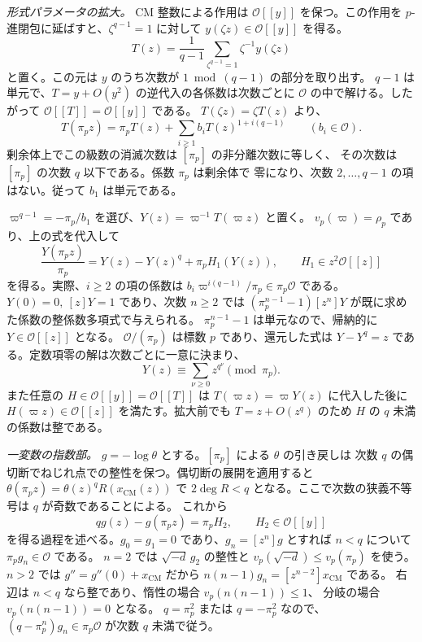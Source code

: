 \emph{形式パラメータの拡大。}
CM 整数による作用は \(\mathcal O[[y]]\) を保つ。この作用を
\(p\)-進閉包に延ばすと、\(\zeta^{q-1}=1\) に対して
\(y(\zeta z)\in\mathcal O[[y]]\) を得る。
\[
 T(z)=\frac{1}{q-1}\sum_{\zeta^{q-1}=1}\zeta^{-1}y(\zeta z)
\]
と置く。この元は \(y\) のうち次数が \(1\bmod(q-1)\) の部分を取り出す。
\(q-1\) は単元で、\(T=y+O(y^2)\) の逆代入の各係数は次数ごとに
\(\mathcal O\) の中で解ける。したがって
\(\mathcal O[[T]]=\mathcal O[[y]]\) である。
\(T(\zeta z)=\zeta T(z)\) より、
\[
 T(\pi_p z)=\pi_p T(z)+\sum_{i\ge1}b_i T(z)^{1+i(q-1)}
 \qquad (b_i\in\mathcal O).
\]
剰余体上でこの級数の消滅次数は \([\pi_p]\) の非分離次数に等しく、
その次数は \([\pi_p]\) の次数 \(q\) 以下である。係数 \(\pi_p\) は剰余体で
零になり、次数 \(2,\ldots,q-1\) の項はない。従って \(b_1\) は単元である。

\(\varpi^{q-1}=-\pi_p/b_1\) を選び、\(Y(z)=\varpi^{-1}T(\varpi z)\) と置く。
\(v_p(\varpi)=\rho_p\) であり、上の式を代入して
\[
 \frac{Y(\pi_p z)}{\pi_p}=Y(z)-Y(z)^q+\pi_p H_1(Y(z)),
 \qquad H_1\in z^2\mathcal O[[z]]
\]
を得る。実際、\(i\ge2\) の項の係数は
\(b_i\varpi^{i(q-1)}/\pi_p\in\pi_p\mathcal O\) である。
\(Y(0)=0,\ [z]Y=1\) であり、次数 \(n\ge2\) では
\((\pi_p^{n-1}-1)[z^n]Y\) が既に求めた係数の整係数多項式で与えられる。
\(\pi_p^{n-1}-1\) は単元なので、帰納的に \(Y\in\mathcal O[[z]]\) となる。
\(\mathcal O/(\pi_p)\) は標数 \(p\) であり、還元した式は \(Y-Y^q=z\)
である。定数項零の解は次数ごとに一意に決まり、
\begin{equation}\label{eq:upper-formalparam}
 Y(z)\equiv\sum_{\nu\ge0}z^{q^\nu}\pmod{\pi_p}.
\end{equation}
また任意の \(H\in\mathcal O[[y]]=\mathcal O[[T]]\) は
\(T(\varpi z)=\varpi Y(z)\) に代入した後に \(H(\varpi z)\in\mathcal O[[z]]\)
を満たす。拡大前でも \(T=z+O(z^q)\) のため \(H\) の \(q\) 未満の係数は整である。

\emph{一変数の指数部。}
\(g=-\log\theta\) とする。\([\pi_p]\) による \(\theta\) の引き戻しは
次数 \(q\) の偶切断でねじれ点での整性を保つ。偶切断の展開を適用すると
\(\theta(\pi_p z)=\theta(z)^qR(x_\mathrm{CM}(z))\) で
\(2\deg R<q\) となる。ここで次数の狭義不等号は \(q\) が奇数であることによる。
これから
\begin{equation}\label{eq:upper-frobenius}
 q g(z)-g(\pi_p z)=\pi_p H_2,\qquad H_2\in\mathcal O[[y]]
\end{equation}
を得る過程を述べる。\(g_0=g_1=0\) であり、\(g_n=[z^n]g\) とすれば
\(n<q\) について \(\pi_p g_n\in\mathcal O\) である。
\(n=2\) では \(\sqrt{-d}\,g_2\) の整性と
\(v_p(\sqrt{-d})\le v_p(\pi_p)\) を使う。
\(n>2\) では \(g''=g''(0)+x_\mathrm{CM}\) だから
\(n(n-1)g_n=[z^{n-2}]x_\mathrm{CM}\) である。
右辺は \(n<q\) なら整であり、惰性の場合 \(v_p(n(n-1))\le1\)、
分岐の場合 \(v_p(n(n-1))=0\) となる。
\(q=\pi_p^2\) または \(q=-\pi_p^2\) なので、
\((q-\pi_p^n)g_n\in\pi_p\mathcal O\) が次数 \(q\) 未満で従う。

